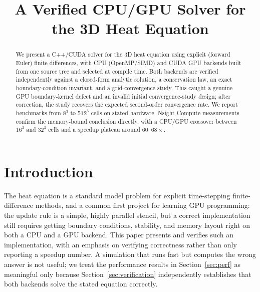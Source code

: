 \documentclass[conference]{IEEEtran}
\begin{document}
\title{A Verified CPU/GPU Solver for the 3D Heat Equation}

\author{
}

\maketitle

\begin{abstract}
We present a C++/CUDA solver for the 3D heat equation using explicit (forward Euler)
finite differences, with CPU (OpenMP/SIMD) and CUDA GPU backends built from one
source tree and selected at compile time. Both backends are verified independently
against a closed-form analytic solution, a conservation law, an exact
boundary-condition invariant, and a grid-convergence study. This caught a genuine GPU
boundary-kernel defect and an invalid initial convergence-study design; after
correction, the study recovers the expected second-order convergence rate. We report benchmarks from $8^3$ to $512^3$ cells on stated hardware. Nsight Compute
measurements confirm the memory-bound conclusion directly, with a CPU/GPU crossover
between $16^3$ and $32^3$ cells and a speedup plateau around $60$--$68\times$.
\end{abstract}

\section{Introduction}

The heat equation is a standard model problem for explicit time-stepping
finite-difference methods, and a common first project for learning GPU programming: the
update rule is a simple, highly parallel stencil, but a correct implementation still
requires getting boundary conditions, stability, and memory layout right on both a
CPU and a GPU backend. This paper presents and verifies such an implementation, with
an emphasis on verifying correctness rather than only reporting a speedup number. A
simulation that runs fast but computes the wrong answer is not useful; we treat the
performance results in Section~\ref{sec:perf} as meaningful only because
Section~\ref{sec:verification} independently establishes that both backends solve the
stated equation correctly.
\end{document}
